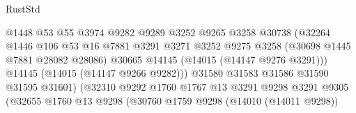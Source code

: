\begin{lexlean}{RustStd}
\begin{coremodule}
                                            @1448
                                            @53
                                            @55
                                            @3974
                                            @9282
                                            @9289
                                            @3252
                                            @9265
                                            @3258
                                            @30738
                                            (@32264
                                              @1446
                                              @106
                                              @53
                                              @16
                                              @7881
                                              @3291
                                              @3271
                                              @3252
                                              @9275
                                              @3258
                                              (@30698 @1445 @7881 @28082 @28086)
                                              @30665
                                              @14145
                                              (@14015 (@14147 @9276 @3291)))
                                            @14145
                                            (@14015 (@14147 @9266 @9282)))
                                          @31580
                                          @31583
                                          @31586
                                          @31590
                                          @31595
                                          @31601)
                                        (@32310
                                          @9292
                                          @1760
                                          @1767
                                          @13
                                          @3291
                                          @9298
                                          @3291
                                          @9305
                                          (@32655
                                            @1760
                                            @13
                                            @9298
                                            (@30760
                                              @1759
                                              @9298
                                              (@14010 (@14011 @9298))

\end{coremodule}
\end{lexlean}
